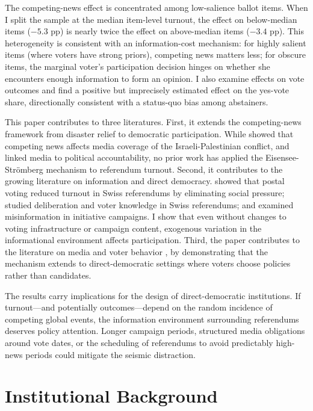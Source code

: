 \documentclass[12pt]{article}
\begin{document}
The competing-news effect is concentrated among low-salience ballot items. When I split the sample at the median item-level turnout, the effect on below-median items ($-5.3$ pp) is nearly twice the effect on above-median items ($-3.4$ pp). This heterogeneity is consistent with an information-cost mechanism: for highly salient items (where voters have strong priors), competing news matters less; for obscure items, the marginal voter's participation decision hinges on whether she encounters enough information to form an opinion. I also examine effects on vote outcomes and find a positive but imprecisely estimated effect on the yes-vote share, directionally consistent with a status-quo bias among abstainers.

This paper contributes to three literatures. First, it extends the competing-news framework \citep{eisensee2007news} from disaster relief to democratic participation. While \citet{durante2018news} showed that competing news affects media coverage of the Israeli-Palestinian conflict, and \citet{campante2018media} linked media to political accountability, no prior work has applied the Eisensee-Str\"omberg mechanism to referendum turnout. Second, it contributes to the growing literature on information and direct democracy. \citet{funk2010social} showed that postal voting reduced turnout in Swiss referendums by eliminating social pressure; \citet{hager2019does} studied deliberation and voter knowledge in Swiss referendums; and \citet{braun2019fake} examined misinformation in initiative campaigns. I show that even without changes to voting infrastructure or campaign content, exogenous variation in the informational environment affects participation. Third, the paper contributes to the literature on media and voter behavior \citep{stromberg2004radio, gentzkow2006media, dellavigna2007fox, gerber2009does, snyder2010press, ferraz2008exposing}, by demonstrating that the mechanism extends to direct-democratic settings where voters choose policies rather than candidates.

The results carry implications for the design of direct-democratic institutions. If turnout---and potentially outcomes---depend on the random incidence of competing global events, the information environment surrounding referendums deserves policy attention. Longer campaign periods, structured media obligations around vote dates, or the scheduling of referendums to avoid predictably high-news periods could mitigate the seismic distraction.

\section{Institutional Background}
\end{document}
